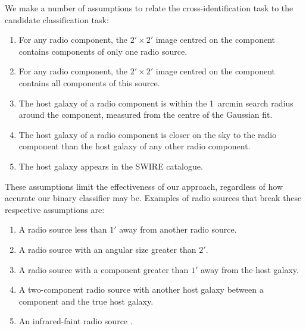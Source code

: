     We make a number of assumptions to relate the cross-identification task to
    the candidate classification task:
    \begin{enumerate}
      \item {For any radio component, the $2' \times 2'$ image centred on the component contains components of only one radio source.}
      \item {For any radio component, the $2' \times 2'$ image centred on the component contains all components of this source.}
      \item The host galaxy of a radio component is within the 1~arcmin {search radius around the component, measured from the centre of the Gaussian fit}.
      \item The host galaxy of a radio component is closer on the sky to the
        radio component than the host galaxy of any other radio component.
      \item The host galaxy appears in the SWIRE catalogue.
    \end{enumerate}
    These assumptions limit the effectiveness of our approach, regardless of
    how accurate our binary classifier may be. {Examples of radio sources that break these respective assumptions are:}
    \begin{enumerate}
      \item {A radio source less than $1'$ away from another radio source.}
      \item {A radio source with an angular size greater than $2'$.}
      \item {A radio source with a component greater than $1'$ away from the host galaxy.}
      \item {A two-component radio source with another host galaxy between a component and the true host galaxy.}
      \item {An infrared-faint radio source \citep[as in][]{collier14irfaint}.}
    \end{enumerate}

